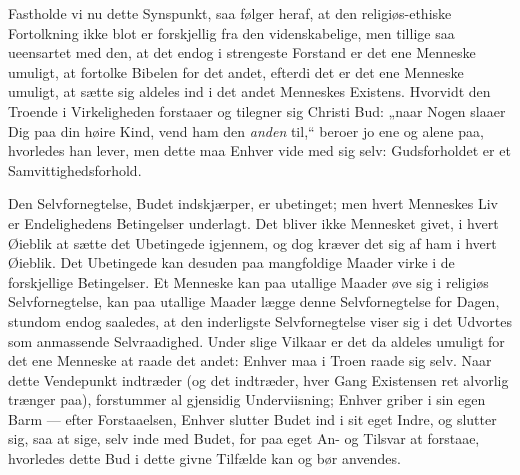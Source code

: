 \documentclass[12pt,a4paper]{book}
\begin{document}
Fastholde vi nu dette Synspunkt, saa følger heraf, at den religiøs-ethiske
Fortolkning ikke blot er forskjellig fra den videnskabelige, men tillige saa
ueensartet med den, at det endog i strengeste Forstand er det ene Menneske
umuligt, at fortolke Bibelen for det andet, efterdi det er det ene Menneske
umuligt, at sætte sig aldeles ind i det andet Menneskes Existens. Hvorvidt
den Troende i Virkeligheden forstaaer og tilegner sig Christi Bud: „naar
Nogen slaaer Dig paa din høire Kind, vend ham den \emph{anden} til,“ beroer
jo ene og alene paa, hvorledes han lever, men dette maa Enhver vide med sig
selv: Gudsforholdet er et Samvittighedsforhold.

Den Selvfornegtelse, Budet indskjærper, er ubetinget; men hvert Menneskes Liv
er Endelighedens Betingelser underlagt. Det bliver ikke Mennesket givet, i
hvert Øieblik at sætte det Ubetingede igjennem, og dog kræver det sig af ham
i hvert Øieblik. Det Ubetingede kan desuden paa mangfoldige Maader virke i de
forskjellige Betingelser. Et Menneske kan paa utallige Maader øve sig i
religiøs Selvfornegtelse, kan paa utallige Maader lægge denne Selvfornegtelse
for Dagen, stundom endog saaledes, at den inderligste Selvfornegtelse viser
sig i det Udvortes som anmassende Selvraadighed. Under slige Vilkaar er det
da aldeles umuligt for det ene Menneske at raade det andet: Enhver maa i
Troen raade sig selv. Naar dette Vendepunkt indtræder (og det indtræder, hver
Gang Existensen ret alvorlig trænger paa), forstummer al gjensidig
Underviisning; Enhver griber i sin egen Barm --- efter Forstaaelsen, Enhver
slutter Budet ind i sit eget Indre, og slutter sig, saa at sige, selv inde
med Budet, for paa eget An- og Tilsvar at forstaae, hvorledes dette Bud i
dette givne Tilfælde kan og bør anvendes.
\end{document}
